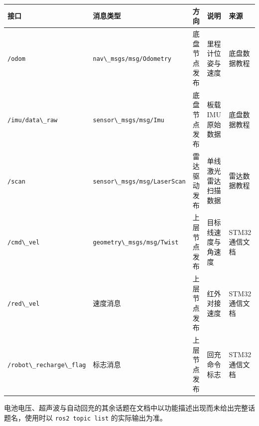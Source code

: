 \begin{longtable}[]{@{}
  >{\raggedright\arraybackslash}p{}
  >{\raggedright\arraybackslash}p{}
  >{\raggedright\arraybackslash}p{}
  >{\raggedright\arraybackslash}p{}
  >{\raggedright\arraybackslash}p{}@{}}
\toprule\noalign{}
\begin{minipage}[b]{\linewidth}\raggedright
接口
\end{minipage} & \begin{minipage}[b]{\linewidth}\raggedright
消息类型
\end{minipage} & \begin{minipage}[b]{\linewidth}\raggedright
方向
\end{minipage} & \begin{minipage}[b]{\linewidth}\raggedright
说明
\end{minipage} & \begin{minipage}[b]{\linewidth}\raggedright
来源
\end{minipage} \\
\midrule\noalign{}
\endhead
\bottomrule\noalign{}
\endlastfoot
\passthrough{\lstinline!/odom!} &
\passthrough{\lstinline!nav\_msgs/msg/Odometry!} & 底盘节点发布 &
里程计位姿与速度 & 底盘数据教程 \\
\passthrough{\lstinline!/imu/data\_raw!} &
\passthrough{\lstinline!sensor\_msgs/msg/Imu!} & 底盘节点发布 & 板载 IMU
原始数据 & 底盘数据教程 \\
\passthrough{\lstinline!/scan!} &
\passthrough{\lstinline!sensor\_msgs/msg/LaserScan!} & 雷达驱动发布 &
单线激光雷达扫描数据 & 雷达数据教程 \\
\passthrough{\lstinline!/cmd\_vel!} &
\passthrough{\lstinline!geometry\_msgs/msg/Twist!} & 上层节点发布 &
目标线速度与角速度 & STM32 通信文档 \\
\passthrough{\lstinline!/red\_vel!} & 速度消息 & 上层节点发布 &
红外对接速度 & STM32 通信文档 \\
\passthrough{\lstinline!/robot\_recharge\_flag!} & 标志消息 &
上层节点发布 & 回充命令标志 & STM32 通信文档 \\
\end{longtable}

电池电压、超声波与自动回充的其余话题在文档中以功能描述出现而未给出完整话题名，使用时以
\passthrough{\lstinline!ros2 topic list!} 的实际输出为准。

